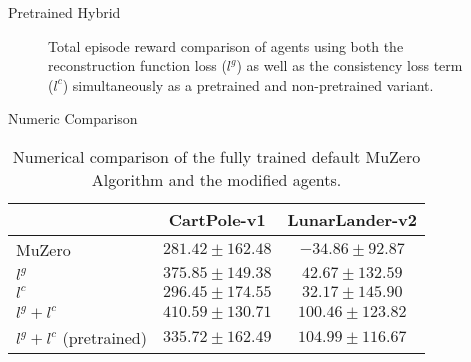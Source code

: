 \begin{frame}[fragile]{Pretrained Hybrid}
\begin{figure}
        \caption{Total episode reward comparison of agents using both the reconstruction function loss ($l^g$) as well as the consistency loss term ($l^c$) simultaneously as a pretrained and non-pretrained variant.}
        \label{fig:pretrained_results}
    \end{figure}
\end{frame}

\begin{frame}{Numeric Comparison}
    \begin{table}
        \centering
        \begin{tabular}{|l||c|c|}
            \hline
            & CartPole-v1 & LunarLander-v2 \\
            \hline \hline
            MuZero & $281.42 \pm 162.48$ & $-34.86 \pm 92.87$ \\
            \hline
            $l^g$ & $375.85 \pm 149.38$ & $42.67 \pm 132.59$\\
            \hline
            $l^c$ & $296.45 \pm 174.55$ & $32.17 \pm 145.90$ \\
            \hline
            $l^g + l^c$ & $\mathbf{410.59 \pm 130.71}$ & $100.46 \pm 123.82$ \\
            \hline
            $l^g + l^c$ (pretrained) & $335.72 \pm 162.49$ & $\mathbf{104.99 \pm 116.67}$ \\
            \hline
        \end{tabular}
        \caption{Numerical comparison of the fully trained default MuZero Algorithm and the modified agents.}
        \label{tab:results_table}
    \end{table}
\end{frame}

